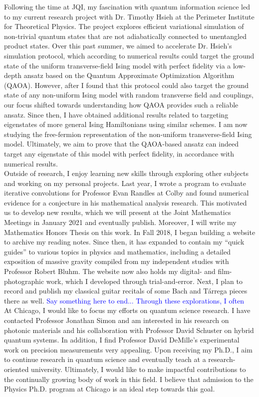 \documentclass[12pt]{article}
\begin{document}
Following the time at JQI, my fascination with quantum information science led to my current research project with Dr. Timothy Hsieh at the Perimeter Institute for Theoretical Physics. The project explores efficient variational simulation of non-trivial quantum states that are not adiabatically connected to unentangled product states. Over this past summer, we aimed to accelerate Dr. Hsieh's simulation protocol, which according to numerical results could target the ground state of the uniform transverse-field Ising model with perfect fidelity via a low-depth ansatz based on the Quantum Approximate Optimization Algorithm (QAOA). However, after I found that this protocol could also target the ground state of any non-uniform Ising model with random transverse field and couplings, our focus shifted towards understanding how QAOA provides such a reliable ansatz. Since then, I have obtained additional results related to targeting eigenstates of more general Ising Hamiltonians using similar schemes. I am now studying the free-fermion representation of the non-uniform transverse-field Ising model. Ultimately, we aim to prove that the QAOA-based ansatz can indeed target any eigenstate of this model with perfect fidelity, in accordance with numerical results.  \\

Outside of research, I enjoy learning new skills through exploring other subjects and working on my personal projects. Last year, I wrote a program to evaluate iterative convolutions for Professor Evan Randles at Colby and found numerical evidence for a conjecture in his mathematical analysis research. This motivated us to develop new results, which we will present at the Joint Mathematics Meetings in January 2021 and eventually publish. Moreover, I will write my Mathematics Honors Thesis on this work. In Fall 2018, I began building a website to archive my reading notes. Since then, it has expanded to contain my ``quick guides'' to various topics in physics and mathematics, including a detailed exposition of massive gravity compiled from my independent studies with Professor Robert Bluhm. The website now also holds my digital- and film-photographic work, which I developed through trial-and-error. Next, I plan to record and publish my classical guitar recitals of some Bach and T\'{a}rrega pieces there as well. \textcolor{blue}{Say something here to end... Through these explorations, I often }  \\

At Chicago, I would like to focus my efforts on quantum science research. I have contacted Professor Jonathan Simon and am interested in his research on photonic materials and his collaboration with Professor David Schuster on hybrid quantum systems. In addition, I find Professor David DeMille's experimental work on precision measurements very appealing. Upon receiving my Ph.D., I aim to continue research in quantum science and eventually teach at a research-oriented university. Ultimately, I would like to make impactful contributions to the continually growing body of work in this field. I believe that admission to the Physics Ph.D. program at Chicago is an ideal step towards this goal. \\
\end{document}
